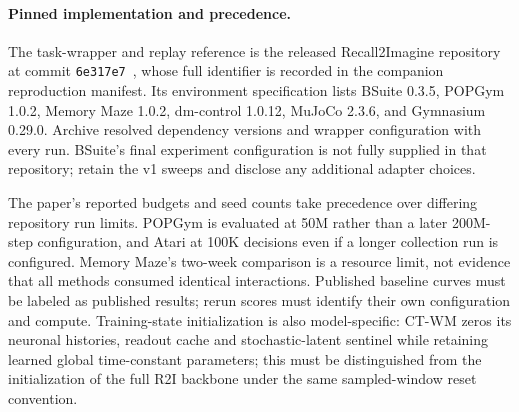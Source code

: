 \documentclass{article}
\begin{document}
\paragraph{Pinned implementation and precedence.}
The task-wrapper and replay reference is the released Recall2Imagine repository at commit \texttt{6e317e7}~\cite{r2i2024code}, whose full identifier is recorded in the companion reproduction manifest. Its environment specification lists BSuite 0.3.5, POPGym 1.0.2, Memory Maze 1.0.2, dm-control 1.0.12, MuJoCo 2.3.6, and Gymnasium 0.29.0. Archive resolved dependency versions and wrapper configuration with every run. BSuite's final experiment configuration is not fully supplied in that repository; retain the v1 sweeps and disclose any additional adapter choices.

The paper's reported budgets and seed counts take precedence over differing repository run limits. POPGym is evaluated at 50M rather than a later 200M-step configuration, and Atari at 100K decisions even if a longer collection run is configured. Memory Maze's two-week comparison is a resource limit, not evidence that all methods consumed identical interactions. Published baseline curves must be labeled as published results; rerun scores must identify their own configuration and compute. Training-state initialization is also model-specific: CT-WM zeros its neuronal histories, readout cache and stochastic-latent sentinel while retaining learned global time-constant parameters; this must be distinguished from the initialization of the full R2I backbone under the same sampled-window reset convention.
\end{document}
